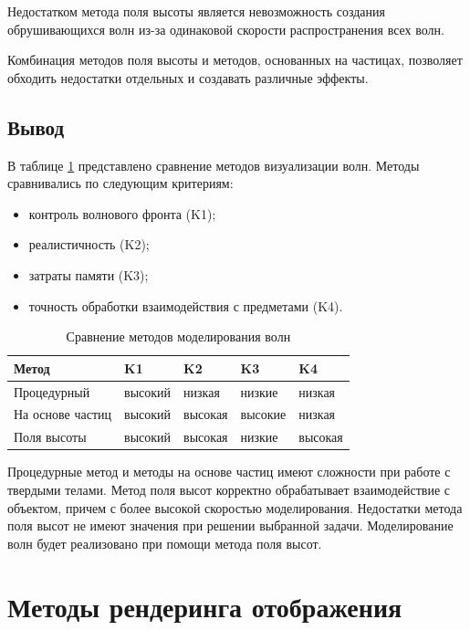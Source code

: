 Недостатком метода поля высоты является невозможность создания обрушивающихся волн  из-за одинаковой скорости распространения всех волн.

Комбинация методов поля высоты и методов, основанных на частицах, позволяет обходить недостатки отдельных и создавать различные эффекты.

\subsection*{Вывод}

В таблице \ref{tab:compare} представлено сравнение методов визуализации волн. Методы сравнивались по следующим критериям:

\begin{itemize}
	\item контроль волнового фронта (K1);
	\item реалистичность (K2);
	\item затраты памяти (K3);
	\item точность обработки взаимодействия с предметами (K4).
\end{itemize}

\begin{table}[h]
    \caption{Сравнение методов моделирования волн}
    \begin{center}
        \begin{tabular}{|l|l|l|l|l|}
            \hline
            Метод & K1 & K2 & K3 & K4 \\ \hline
            Процедурный & высокий & низкая & низкие & низкая \\ \hline
		    На основе частиц & высокий & высокая & высокие  & низкая \\ \hline
            Поля высоты & высокий & высокая & низкие & высокая  \\ \hline
        \end{tabular}
    \end{center}
    \label{tab:compare}
\end{table}

Процедурные метод и методы на основе частиц имеют сложности при работе с твердыми телами. Метод поля высот корректно обрабатывает взаимодействие с объектом, причем с более высокой скоростью моделирования. Недостатки метода поля высот не имеют значения при решении выбранной задачи. Моделирование волн будет реализовано при помощи метода поля высот.

\section{Методы рендеринга отображения}

